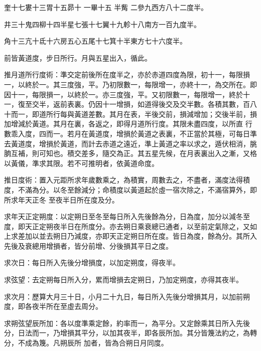 \begin{pinyinscope}
 奎十七婁十三胃十五昴十
 一畢十五
 半觜
 二參九西方八十二度半。



 井三十鬼四柳十四半星七張十七翼十九軫十八南方一百九度半。



 角十三亢十氐十六房五心五尾十七箕十半東方七十六度半。



 前皆黃道度，步日所行。月與五星出入，循此。



 推月道所行度術：準交定前後所在度半之，亦於赤道四度為限，初十一，每限損一，以終於一。其三度強，平。乃初限數一，每限增一，亦終十一，為交所在。即因十一，每限損一，以終於一。亦三度強，平。又初限數一，每限增一，終於十一，復至交半，返前表裏。仍因十一增損，如道得後交及交半數。各積其數，百八十而一，即道所行每與黃道差數。其月在表，半後交前，損減增加；交後半前，損加增減於黃道。其月在裏，各返之，即得月道所行度。其限未盡四度，以所直
 行數乖入度，四而一。若月在黃道度，增損於黃道之表裏，不正當於其極，可每日準去黃道度，增損於黃道，而計去赤道之遠近，準上黃道之率以求之，遁伏相消，朓朒互補，則可知也。積交差多，隨交為正。其五星先候，在月表裏出入之漸，又格以黃儀，準求其限。若不可推明者，依黃道命度。



 推日度術：置入元距所求年歲數乘之，為積實，周數去之，不盡者，滿度法得積度，不滿為分。以冬至餘減分；命積度以黃道起於虛一宿次除之，不滿宿算外，即所求年天正冬
 至夜半日所在度及分。



 求年天正定朔度：以定朔日至冬至每日所入先後餘為分，日為度，加分以減冬至度，即天正定朔夜半日在所度分。亦去朔日乘衰總已通者，以至前定氣除之，又如上求差加以並去朔日乃減度，亦即天正定朔日所在度。皆日為度，餘為分。其所入先後及衰總用增損者，皆分前增、分後損其平日之度。



 求次日：每日所入先後分增損度，以加定朔度，得夜半。



 求弦望：去定朔每日所入分，累而增損去定朔日，乃加定朔度，亦得其夜半。



 求次月：歷算大月三十日，小月二十九日，每日所入先後分增損其月，以加前朔度，即各夜半所在至虛去周分。



 求朔弦望辰所加：各以度準乘定餘，約率而一，為平分。又定餘乘其日所入先後分，日法而一，乃增損其平分，以加其夜半，即各辰所加。其分皆篾法約之，為轉分，不成為篾。凡朔辰所
 加者，皆為合朔日月同度。




\end{pinyinscope}
